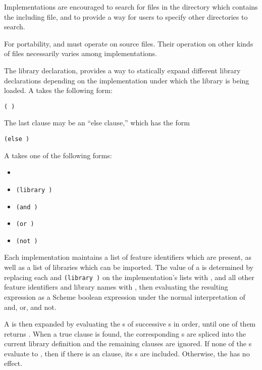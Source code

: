 \begin{note}
Implementations are encouraged to search for files in the directory
which contains the including file, and to provide a way for users to
specify other directories to search.
\end{note}

\begin{note}
For portability,  and  must operate on source files.
Their operation on other kinds of files necessarily varies among
implementations.
\end{note}

The  library declaration,
provides a way to statically
expand different library declarations depending on the 
implementation under which the library is being loaded.  A
 takes the following form:

{\tt(  \dotsfoo)}

The last clause may be an ``else clause,'' which has the form

{\tt(else  \dotsfoo)}

A  takes one of the following forms:

\begin{itemize}
\item {\tt{}}
\item {\tt(library )}
\item {\tt(and  \dotsfoo)}
\item {\tt(or  \dotsfoo)}
\item {\tt(not )}
\end{itemize}

Each implementation maintains a list of feature identifiers which are
present, as well as a list of libraries which can be imported.  The
value of a  is determined by replacing
each  and {\tt(library )}
on the implementation's lists with \schtrue, and all other feature
identifiers and library names with \schfalse, then evaluating the
resulting expression as a Scheme boolean expression under the normal
interpretation of {\cf and}, {\cf or}, and {\cf not}.

A  is then expanded by evaluating the
s of successive s
in order, until one of them returns \schtrue.  When a true clause is
found, the corresponding s are spliced into
the current library definition and the remaining clauses are ignored.
If none of the s evaluate to \schtrue, then
if there is an  clause, its s are
included.  Otherwise, the  has no effect.

